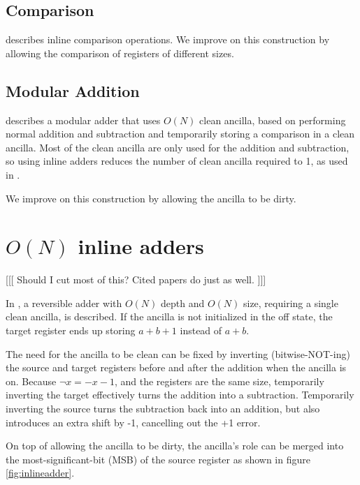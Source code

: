 \documentclass[twocolumn]{article}
\begin{document}
\subsection{Comparison}

\cite{takahashi2005} describes inline comparison operations.
We improve on this construction by allowing the comparison of registers of different sizes.

\subsection{Modular Addition}

\cite{vedral1995} describes a modular adder that uses $O(N)$ clean ancilla, based on performing normal addition and subtraction and temporarily storing a comparison in a clean ancilla.
Most of the clean ancilla are only used for the addition and subtraction, so using inline adders reduces the number of clean ancilla required to 1, as used in \cite{haner2016}.

We improve on this construction by allowing the ancilla to be dirty.

\section{$O(N)$ inline adders} \label{sec:first-circuit}

[[[ Should I cut most of this? Cited papers do just as well. ]]]

In \cite{van2004}, a reversible adder with $O(N)$ depth and $O(N)$ size, requiring a single clean ancilla, is described.
If the ancilla is not initialized in the off state, the target register ends up storing $a+b+1$ instead of $a+b$.

The need for the ancilla to be clean can be fixed by inverting (bitwise-NOT-ing) the source and target registers before and after the addition when the ancilla is on.
Because $\lnot x = -x-1$, and the registers are the same size, temporarily inverting the target effectively turns the addition into a subtraction.
Temporarily inverting the source turns the subtraction back into an addition, but also introduces an extra shift by -1, cancelling out the +1 error.

On top of allowing the ancilla to be dirty, the ancilla's role can be merged into the most-significant-bit (MSB) of the source register as shown in figure \ref{fig:inlineadder}.
\end{document}
